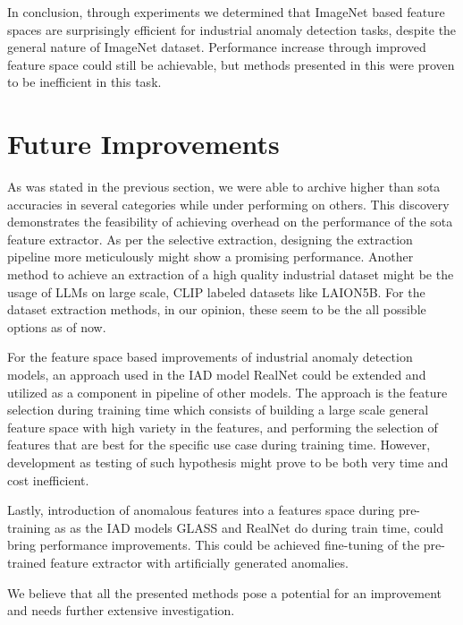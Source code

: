 In conclusion, through experiments we determined that ImageNet based feature spaces are surprisingly efficient for industrial anomaly detection tasks, despite the general nature of ImageNet dataset. Performance increase through improved feature space could still be achievable, but methods presented in this were proven to be inefficient in this task.

\section{Future Improvements}

As was stated in the previous section, we were able to archive higher than sota accuracies in several categories while under performing on others. This discovery demonstrates the feasibility of achieving overhead on the performance of the sota feature extractor. As per the selective extraction, designing the extraction pipeline more meticulously might show a promising performance. Another method to achieve an extraction of a high quality industrial dataset might be the usage of LLMs on large scale, CLIP labeled datasets like LAION5B\cite{laion5b}. For the dataset extraction methods, in our opinion, these seem to be the all possible options as of now.

For the feature space based improvements of industrial anomaly detection models, an approach used in the IAD model RealNet\cite{realnet} could be extended and utilized as a component in pipeline of other models. The approach is the feature selection during training time which consists of building a large scale general feature space with high variety in the features, and performing the selection of features that are best for the specific use case during training time\cite{realnet}. However, development as testing of such hypothesis might prove to be both very time and cost inefficient.

Lastly, introduction of anomalous features into a features space during pre-training as as the IAD models GLASS\cite{glass} and RealNet\cite{realnet} do during train time, could bring performance improvements. This could be achieved fine-tuning of the pre-trained feature extractor with artificially generated anomalies.

We believe that all the presented methods pose a potential for an improvement and needs further extensive investigation.